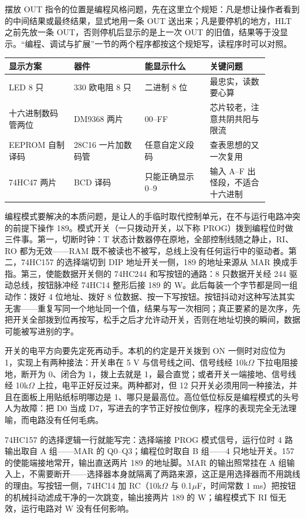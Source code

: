 摆放 OUT 指令的位置是编程风格问题，先在这里立个规矩：凡是想让操作者看到的中间结果或最终结果，显式地用一条 OUT 送出来；凡是要停机的地方，HLT 之前先放一条 OUT，否则停机后显示的是上一次 OUT 的旧值，结果等于没显示。“编程、调试与扩展”一节的两个程序都按这个规矩写，读程序时可以对照。

\begin{longtable}{L{0.22\linewidth}L{0.24\linewidth}L{0.22\linewidth}L{0.20\linewidth}}
\toprule
显示方案 & 器件 & 能显示什么 & 关键问题 \\
\midrule
LED 8 只 & 330 欧电阻 8 只 & 二进制 8 位 & 最忠实，读数要心算 \\\tablerowrule
十六进制数码管两位 & DM9368 两片 & 00–FF & 芯片较老，注意共阴共阳与限流 \\\tablerowrule
EEPROM 自制译码 & 28C16 一片加数码管 & 任意自定义段码 & 查表思想的又一次复用 \\\tablerowrule
74HC47 两片 & BCD 译码 & 只能正确显示 0–9 & 输入 A–F 出怪段，不适合十六进制 \\
\bottomrule
\end{longtable}

编程模式要解决的本质问题，是让人的手临时取代控制单元，在不与运行电路冲突的前提下操作 189。模式开关（一只拨动开关，以下称 PROG）拨到编程位时做三件事。第一，切断时钟：T 状态计数器停在原地，全部控制线随之静止，RI、RO 都为无效——RAM 既不被读也不被写，总线上没有任何运行中的驱动者。第二，74HC157 的选择端切到 DIP 地址开关一侧，189 的地址来源从 MAR 换成手指。第三，使能数据开关侧的 74HC244 和写按钮的通路：8 只数据开关经 244 驱动总线，按钮脉冲经 74HC14 整形后接 189 的 W。此后每装一个字节都是同一组动作：拨好 4 位地址、拨好 8 位数据、按一下写按钮。按钮抖动对这种写法其实无害——重复写同一个地址同一个值，结果与写一次相同；真正要紧的是次序，先把开关全部拨到位再按写，松手之后才允许动开关，否则在地址切换的瞬间，数据可能被写进别的字。

开关的电平方向要先定死再动手。本机的约定是开关拨到 ON 一侧时对应位为 1，实现上有两种接法：开关串在 5 V 与信号线之间、信号线经 10k$\Omega$ 下拉电阻接地，断开为 0、闭合为 1，拨上去就是 1，最合直觉；或者开关一端接地、信号线经 10k$\Omega$ 上拉，电平正好反过来。两种都对，但 12 只开关必须用同一种接法，并且在面板上用贴纸标明哪边是 1、哪只是最高位。高位低位标反是编程模式的头号人为故障：把 D0 当成 D7，写进去的字节正好按位倒序，程序的表现完全无法理喻，而电路没有任何毛病。

74HC157 的选择逻辑一行就能写完：选择端接 PROG 模式信号，运行位时 4 路输出取自 A 组——MAR 的 Q0–Q3；编程位时取自 B 组——4 只地址开关。157 的使能端接地常开，输出直送两片 189 的地址脚。MAR 的输出照常挂在 A 组输入上，不需要断开——选择器本身就隔离了两路来源，这正是用选择器而不用跳线的理由。写按钮一侧，74HC14 加 RC（10k$\Omega$ 与 0.1$\mu$F，时间常数 1 ms）把按钮的机械抖动滤成干净的一次跳变，输出接两片 189 的 W；编程模式下 RI 恒无效，运行电路对 W 没有任何影响。

